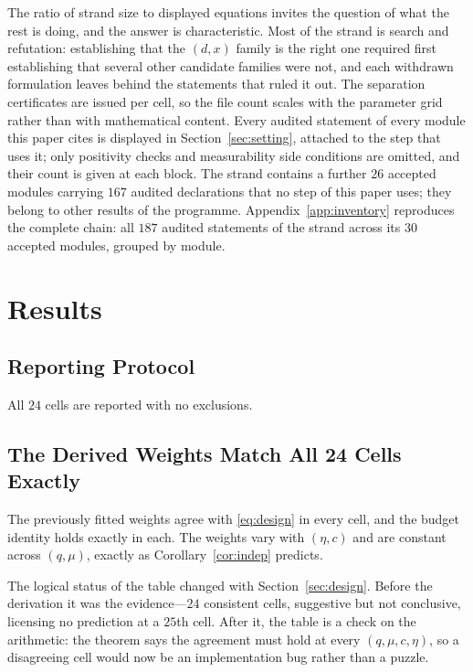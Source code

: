 The ratio of strand size to displayed equations invites the question of what the rest is doing,
and the answer is characteristic. Most of the strand is search and refutation: establishing
that the $(d,x)$ family is the right one required first establishing that several other
candidate families were not, and each withdrawn formulation leaves behind the statements that
ruled it out. The separation certificates are issued per cell, so the file count scales with
the parameter grid rather than with mathematical content.
Every audited statement of every module this paper cites is displayed in Section~\ref{sec:setting}, attached to the step that uses it; only positivity checks and measurability side conditions are omitted, and their count is given at each block. The strand contains a further $26$ accepted modules carrying $167$ audited declarations that no step of this paper uses; they belong to other results of the programme. Appendix~\ref{app:inventory} reproduces the complete chain: all $187$ audited statements of the strand across its $30$ accepted modules, grouped by module.

\section{Results}
\label{sec:results}

\subsection{Reporting Protocol}

All $24$ cells are reported with no exclusions.

\subsection{The Derived Weights Match All 24 Cells Exactly}

The previously fitted weights agree with \eqref{eq:design} in every cell, and the budget
identity holds exactly in each. The weights vary with $(\eta,c)$ and are constant across
$(q,\mu)$, exactly as Corollary~\ref{cor:indep} predicts.

The logical status of the table changed with Section~\ref{sec:design}. Before the derivation
it was the evidence---$24$ consistent cells, suggestive but not conclusive, licensing no
prediction at a $25$th cell. After it, the table is a check on the arithmetic: the theorem
says the agreement must hold at every $(q,\mu,c,\eta)$, so a disagreeing cell would now be an
implementation bug rather than a puzzle.

